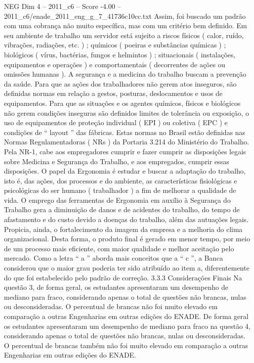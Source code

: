 \begin{textsample}{NEG Dim 4 – 2011\_c6 – Score -4.00 – 2011\_c6/enade\_2011\_eng\_g\_7\_41736c10cc.txt}
Assim, foi buscado um padrão com uma cobrança não muito específica, mas com um critério bem definido.
Em seu ambiente de trabalho um servidor está sujeito a riscos físicos ( calor, ruído, vibrações, radiações, etc. ) ; químicos ( poeiras e substâncias químicas ) ; biológicos ( vírus, bactérias, fungos e helmintos ) ; situacionais ( instalações, equipamentos e operações ) e comportamentais ( decorrentes de ações ou omissões humanas ).
A segurança e a medicina do trabalho buscam a prevenção da saúde.
Para que as ações dos trabalhadores não gerem atos inseguros, são definidas normas em relação a gestos, posturas, deslocamentos e usos de equipamentos.
Para que as situações e os agentes químicos, físicos e biológicos não gerem condições inseguras são definidos limites de tolerância ou exposição, o uso de equipamentos de proteção individual ( EPI ) ou coletiva ( EPC ) e condições de “ layout ” das fábricas.
Estas normas no Brasil estão definidas nas Normas Regulamentadoras ( NRs ) da Portaria 3.214 do Ministério do Trabalho.
Pela NR-1, cabe aos empregadores cumprir e fazer cumprir as disposições legais sobre Medicina e Segurança do Trabalho, e aos empregados, cumprir essas disposições.
O papel da Ergonomia é estudar e buscar a adaptação do trabalho, isto é, das ações, dos processos e do ambiente, as características fisiológicas e psicológicas do ser humano ( trabalhador ) a fim de melhorar a qualidade de vida.
O emprego das ferramentas de Ergonomia em auxílio à Segurança do Trabalho gera a diminuição de danos e de acidentes do trabalho, do tempo de afastamento e do custo devido a doenças do trabalho, além das autuações legais.
Propicia, ainda, o fortalecimento da imagem da empresa e a melhoria do clima organizacional.
Desta forma, o produto final é gerado em menor tempo, por meio de um processo mais eficiente, com maior qualidade e melhor aceitação pelo mercado.
Como a letra “ a ” aborda mais conceitos que a “ c ”, a Banca considerou que o maior grau poderia ter sido atribuído ao item a, diferentemente do que foi estabelecido pelo padrão de correção. 3.3.3 Considerações Finais Na questão 3, de forma geral, os estudantes apresentaram um desempenho de mediano para fraco, considerando apenas o total de questões não brancas, nulas ou desconsideradas.
O percentual de brancas não foi muito elevado em comparação a outras Engenharias em outras edições do ENADE.
De forma geral os estudantes apresentaram um desempenho de mediano para fraco na questão 4, considerando apenas o total de questões não brancas, nulas ou desconsideradas.
O percentual de brancas também não foi muito elevado em comparação a outras Engenharias em outras edições do ENADE.

\end{textsample}
